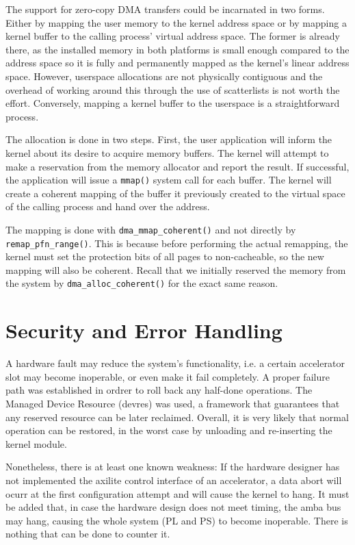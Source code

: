 The support for zero-copy DMA transfers could be incarnated in two forms. Either by mapping the
user memory to the kernel address space or by mapping a kernel buffer to the calling process'
virtual address space. The former is already there, as the installed memory in both platforms
is small enough compared to the address space so it is fully and permanently mapped as the
kernel's linear address space. However, userspace allocations are not physically contiguous
and the overhead of working around this through the use of \glspl{scatterlist} is not worth the effort.
Conversely, mapping a kernel buffer to the userspace is a straightforward process.

The allocation is done in two steps. First, the user application will inform the kernel 
about its desire to acquire memory buffers. The kernel will attempt to make a reservation
from the memory allocator and report the result. If successful, the application will issue
a \texttt{mmap()} system call for each buffer. The kernel will create a coherent mapping of the
buffer it previously created to the virtual space of the calling process and hand over the address.

The mapping is done with \texttt{dma\_mmap\_coherent()} and not directly by \texttt{remap\_pfn\_range()}.
This is because before performing the actual remapping, the kernel must set the protection bits of all pages
to non-cacheable, so the new mapping will also be coherent. Recall that we initially reserved
the memory from the system by \texttt{dma\_alloc\_coherent()} for the exact same reason.


\section{Security and Error Handling}
\label{sec:security}

A hardware fault may reduce the system's functionality, i.e. a certain accelerator slot
may become inoperable, or even make it fail completely. 
A proper failure path was established in ordrer to roll back any half-done operations.
The Managed Device Resource (devres) was used, a framework that guarantees that
any reserved resource can be later reclaimed.
Overall, it is very likely that normal operation can be restored, in the worst case
by unloading and re-inserting the kernel module.

Nonetheless, there is at least one known weakness: If the hardware designer has not implemented
the \gls{axilite} control interface of an accelerator, a data abort will ocurr at the first
configuration attempt and will cause the kernel to hang. It must be added that, in case
the hardware design does not meet timing, the \gls{amba} bus may hang, causing the whole system (PL and PS)
to become inoperable. There is nothing that can be done to counter it.


